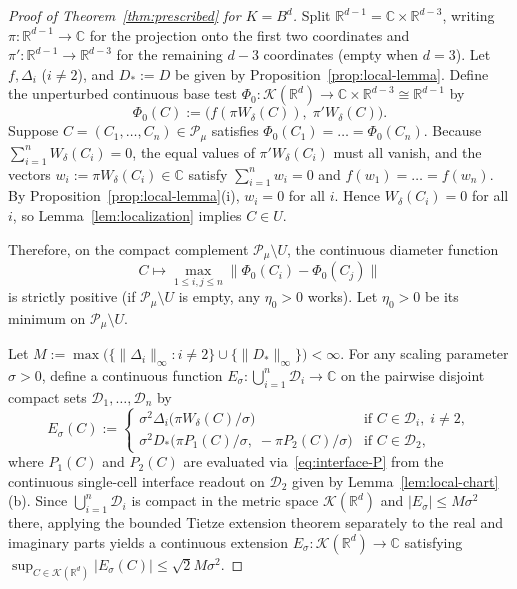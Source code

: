 \documentclass[11pt,a4paper]{amsart}
\numberwithin{equation}{section}
\theoremstyle{definition}
\newcommand{\R}{\mathbb{R}}
\newcommand{\C}{\mathbb{C}}
\newcommand{\Kcal}{\mathcal{K}}
\newcommand{\Pcal}{\mathcal{P}}
\newcommand{\Dcal}{\mathcal{D}}
\begin{document}
\begin{proof}[Proof of Theorem~\ref{thm:prescribed} for $K = B^d$]
Split $\R^{d-1} = \C \times \R^{d-3}$, writing $\pi : \R^{d-1} \to \C$ for the projection onto the first two coordinates and $\pi' : \R^{d-1} \to \R^{d-3}$ for the remaining $d-3$ coordinates (empty when $d = 3$). Let $f, \Delta_i$ ($i \ne 2$), and $D_* := D$ be given by Proposition~\ref{prop:local-lemma}. Define the unperturbed continuous base test $\Phi_0 : \Kcal(\R^d) \to \C \times \R^{d-3} \cong \R^{d-1}$ by
\[
\Phi_0(C) := \bigl(f(\pi W_\delta(C)),\; \pi' W_\delta(C)\bigr).
\]
Suppose $C = (C_1, \dots, C_n) \in \Pcal_\mu$ satisfies $\Phi_0(C_1) = \dots = \Phi_0(C_n)$. Because $\sum_{i=1}^n W_\delta(C_i) = 0$, the equal values of $\pi' W_\delta(C_i)$ must all vanish, and the vectors $w_i := \pi W_\delta(C_i) \in \C$ satisfy $\sum_{i=1}^n w_i = 0$ and $f(w_1) = \dots = f(w_n)$. By Proposition~\ref{prop:local-lemma}(i), $w_i = 0$ for all $i$. Hence $W_\delta(C_i) = 0$ for all $i$, so Lemma~\ref{lem:localization} implies $C \in U$.

Therefore, on the compact complement $\Pcal_\mu \setminus U$, the continuous diameter function
\[
C \longmapsto \max_{1 \le i, j \le n} \|\Phi_0(C_i) - \Phi_0(C_j)\|
\]
is strictly positive (if $\Pcal_\mu \setminus U$ is empty, any $\eta_0 > 0$ works). Let $\eta_0 > 0$ be its minimum on $\Pcal_\mu \setminus U$.

Let $M := \max\bigl(\{\|\Delta_i\|_\infty : i \ne 2\} \cup \{\|D_*\|_\infty\}\bigr) < \infty$. For any scaling parameter $\sigma > 0$, define a continuous function $E_\sigma : \bigcup_{i=1}^n \Dcal_i \to \C$ on the pairwise disjoint compact sets $\Dcal_1, \dots, \Dcal_n$ by
\[
E_\sigma(C) :=
\begin{cases}
\sigma^2 \Delta_i\bigl(\pi W_\delta(C)/\sigma\bigr) & \text{if } C \in \Dcal_i,\; i \ne 2, \\
\sigma^2 D_*\bigl(\pi P_1(C)/\sigma,\; -\pi P_2(C)/\sigma\bigr) & \text{if } C \in \Dcal_2,
\end{cases}
\]
where $P_1(C)$ and $P_2(C)$ are evaluated via~\eqref{eq:interface-P} from the continuous single-cell interface readout on $\Dcal_2$ given by Lemma~\ref{lem:local-chart}(b). Since $\bigcup_{i=1}^n \Dcal_i$ is compact in the metric space $\Kcal(\R^d)$ and $|E_\sigma| \le M \sigma^2$ there, applying the bounded Tietze extension theorem separately to the real and imaginary parts yields a continuous extension $E_\sigma : \Kcal(\R^d) \to \C$ satisfying $\sup_{C \in \Kcal(\R^d)} |E_\sigma(C)| \le \sqrt{2} M \sigma^2$.


\end{proof}
\end{document}
